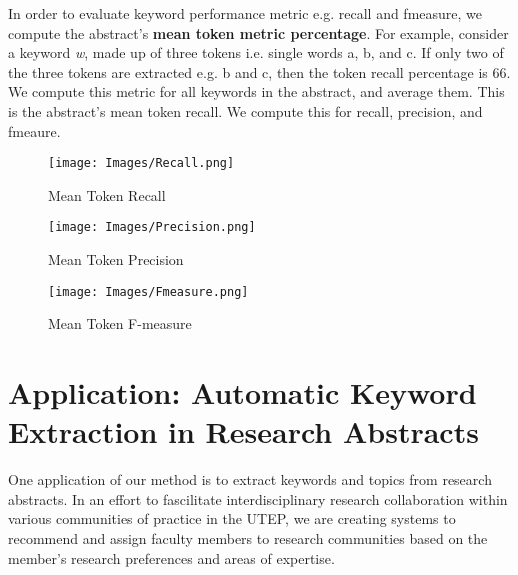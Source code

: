\documentclass[12pt]{article}
\begin{document}
In order to evaluate keyword performance metric e.g. recall and fmeasure, we compute the abstract's \textbf{mean token metric percentage}. For example, consider
a keyword \textit{w}, made up of three tokens i.e. single words a, b, and c. If only two of the three tokens are extracted e.g. b and c, then the token recall percentage
is 66. We compute this metric for all keywords in the abstract, and average them. This is the abstract's mean token recall. We compute this for recall, precision, and fmeaure.


\begin{figure}[H]
\centering
\texttt{[image: Images/Recall.png]}
\caption{Mean Token Recall}
\end{figure}

\begin{figure}[H]
\centering
\texttt{[image: Images/Precision.png]}
\caption{Mean Token Precision}
\end{figure}

\begin{figure}[H]
\centering
\texttt{[image: Images/Fmeasure.png]}
\caption{Mean Token F-measure}
\end{figure}
\section{Application: Automatic Keyword Extraction in Research Abstracts}
One application of our method is to extract keywords and topics from research abstracts. In an effort to fascilitate interdisciplinary research collaboration
within various communities of practice in the UTEP, we are creating systems to recommend and assign faculty members to research communities based on the
member's research preferences and areas of expertise.
\end{document}
